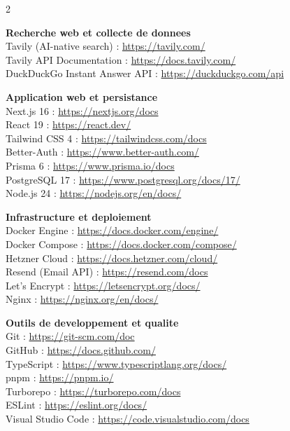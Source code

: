 \documentclass[12pt,a4paper,openany]{report}
\begin{document}
\begin{multicols}{2}
\vspace{0.3cm}

\textbf{\color{ensaBlue}Recherche web et collecte de donnees}\\
Tavily (AI-native search) : \url{https://tavily.com/}\\
Tavily API Documentation : \url{https://docs.tavily.com/}\\
DuckDuckGo Instant Answer API : \url{https://duckduckgo.com/api}

\vspace{0.3cm}

\textbf{\color{ensaBlue}Application web et persistance}\\
Next.js 16 : \url{https://nextjs.org/docs}\\
React 19 : \url{https://react.dev/}\\
Tailwind CSS 4 : \url{https://tailwindcss.com/docs}\\
Better-Auth : \url{https://www.better-auth.com/}\\
Prisma 6 : \url{https://www.prisma.io/docs}\\
PostgreSQL 17 : \url{https://www.postgresql.org/docs/17/}\\
Node.js 24 : \url{https://nodejs.org/en/docs/}

\vspace{0.3cm}

\textbf{\color{ensaBlue}Infrastructure et deploiement}\\
Docker Engine : \url{https://docs.docker.com/engine/}\\
Docker Compose : \url{https://docs.docker.com/compose/}\\
Hetzner Cloud : \url{https://docs.hetzner.com/cloud/}\\
Resend (Email API) : \url{https://resend.com/docs}\\
Let's Encrypt : \url{https://letsencrypt.org/docs/}\\
Nginx : \url{https://nginx.org/en/docs/}

\vspace{0.3cm}

\textbf{\color{ensaBlue}Outils de developpement et qualite}\\
Git : \url{https://git-scm.com/doc}\\
GitHub : \url{https://docs.github.com/}\\
TypeScript : \url{https://www.typescriptlang.org/docs/}\\
pnpm : \url{https://pnpm.io/}\\
Turborepo : \url{https://turborepo.com/docs}\\
ESLint : \url{https://eslint.org/docs/}\\
Visual Studio Code : \url{https://code.visualstudio.com/docs}


\end{multicols}
\end{document}
